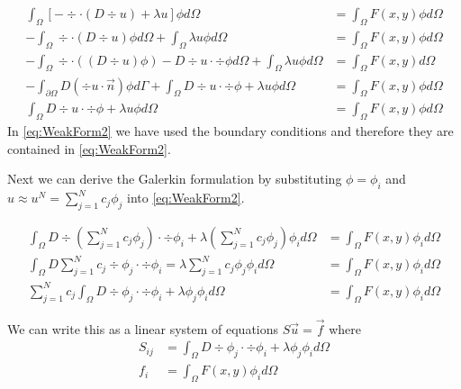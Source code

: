 \documentclass[10pt,a4paper]{article}
\begin{document}
\begin{equation}
\label{eq:WeakForm2}
\begin{split}
\int_\Omega \left[ -\div \cdot \left( D \div u \right) + \lambda u \right] \phi d\Omega &= \int_\Omega F(x,y) \phi d\Omega \\
- \int_\Omega \div \cdot \left( D \div u \right) \phi d\Omega + \int_\Omega \lambda u \phi d\Omega &= \int_\Omega F(x,y) \phi d\Omega \\
-\int_\Omega \div \cdot \left( \left( D \div u \right) \phi \right) - D \div u \cdot \div \phi d\Omega + \int_\Omega \lambda u \phi d\Omega &= \int_\Omega F(x,y) d\Omega \\
-\int_{\partial \Omega} D \left( \div u \cdot \vec{n} \right) \phi d\Gamma + \int_\Omega D \div u \cdot \div \phi + \lambda u \phi d\Omega &= \int_\Omega F(x,y) \phi d\Omega \\
\int_\Omega D \div u \cdot \div \phi + \lambda u \phi d\Omega &= \int_\Omega F(x,y) \phi d\Omega
\end{split}
\end{equation}
In \cref{eq:WeakForm2} we have used the boundary conditions and therefore they are contained in \cref{eq:WeakForm2}.

Next we can derive the Galerkin formulation by substituting $\phi = \phi_i$ and $u \approx u^N = \sum_{j=1}^N c_j \phi_j$ into \cref{eq:WeakForm2}.

\begin{equation}
\label{eq:Galerkin2}
\begin{split}
\int_\Omega D \div \left( \sum_{j=1}^N c_j \phi_j \right) \cdot \div \phi_i + \lambda \left( \sum_{j=1}^N c_j \phi_j \right) \phi_i d\Omega &= \int_\Omega F(x,y) \phi_i d\Omega \\
\int_\Omega D \sum_{j=1}^N c_j \div \phi_j \cdot \div \phi_i = \lambda \sum_{j=1}^N c_j \phi_j \phi_i d\Omega &= \int_\Omega F(x,y) \phi_i d\Omega \\
\sum_{j=1}^N c_j \int_\Omega D \div \phi_j \cdot \div \phi_i + \lambda \phi_j \phi_i d\Omega &= \int_\Omega F(x,y) \phi_i d\Omega
\end{split}
\end{equation}

We can write this as a linear system of equations $S \vec{u} = \vec{f}$ where
\begin{equation}
\begin{split}
S_{ij} &= \int_\Omega D \div \phi_j \cdot \div \phi_i + \lambda \phi_j \phi_i d\Omega \\
f_i &= \int_\Omega F(x,y) \phi_i d\Omega
\end{split}
\end{equation}
\end{document}
